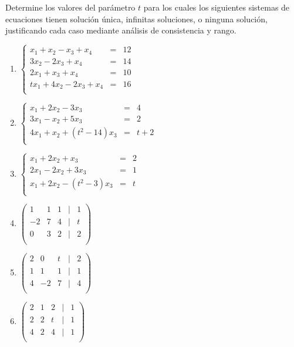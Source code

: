 \begin{prob} Determine los valores del parámetro $t$ para los cuales los siguientes sistemas de ecuaciones tienen solución única, infinitas soluciones, o ninguna solución, justificando cada caso mediante análisis de consistencia y rango.
\begin{multicols}{2}
\begin{enumerate}[$a)$]
\item $\left\lbrace \begin{array}{ccc}
x_1+x_2-x_3+x_4&=&12\\
3x_2-2x_3+x_4&=&14\\
2x_1+x_3+x_4&=&10\\
tx_1+4x_2-2x_3+x_4&=&16\\
\end{array} \right. $

\item $\left\lbrace  \begin{array}{ccc}
x_1+2x_2-3x_3&=&4\\
3x_1-x_2+5x_3&=&2\\
4x_1+x_2+\left(t^2-14\right)x_3&=&t+2\\
\end{array} \right. $

\item $\left\lbrace \begin{array}{ccc}
x_1+2x_2+x_3&=&2\\
2x_1-2x_2+3x_3&=&1\\
x_1+2x_2-\left(t^2-3\right)x_3&=&t\\
\end{array} \right.  $


	\item $\left( \begin{array}{ccccc} 
	1&1 &1&|&1 \\
	-2&7 &4&|&t\\
	0&3 &2&|&2\\
	\end{array} \right)$
	\item $\left( \begin{array}{ccccc} 
	2&0 &t&|&2 \\
	1&1 &1&|&1\\
	4&-2 &7&|&4\\
	\end{array} \right)$
	
	\item $\left( \begin{array}{ccccc} 
	2&1 &2&|&1 \\
	2&2 &t&|&1\\
	4&2 &4&|&1\\
	\end{array} \right)$
\end{enumerate}
\end{multicols}
\end{prob}

